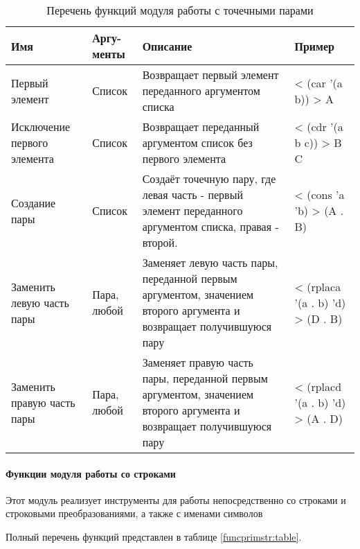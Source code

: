 \begin{xltabular}{\textwidth}{|p{3.6cm}|p{1.8cm}|p{6cm}|X|}
	\caption{Перечень функций модуля работы с точечными парами\label{funcprimpair:table}}\\ \hline
	\centrow Имя & \centrow Аргу- \linebreak менты & \centrow Описание & \centrow Пример \\ \hline
	\finishhead
	Первый элемент & Список & Возвращает первый элемент переданного аргументом списка & < (car '(a b)) \linebreak > A \\ \hline 
	Исключение первого элемента & Список & Возвращает переданный аргументом список без первого элемента & < (cdr '(a b c)) \linebreak > B C \\ \hline 
	Создание пары & Список & Создаёт точечную пару, где левая часть - первый элемент переданного аргументом списка, правая - второй. & < (cons 'a 'b) \linebreak > (A . B) \\ \hline 
	Заменить левую часть пары & Пара, любой & Заменяет левую часть пары, переданной первым аргументом, значением второго аргумента и возвращает получившуюся пару & < (rplaca '(a . b) 'd) \linebreak > (D . B) \\ \hline 
	Заменить правую часть пары & Пара, любой & Заменяет правую часть пары, переданной первым аргументом, значением второго аргумента и возвращает получившуюся пару & < (rplacd '(a . b) 'd) \linebreak > (A . D)
	
\end{xltabular}

\paragraph{Функции модуля работы со строками}

Этот модуль реализует инструменты для работы непосредственно со строками и строковыми преобразованиями, а также с именами символов

Полный перечень функций представлен в таблице \ref{funcprimstr:table}.

